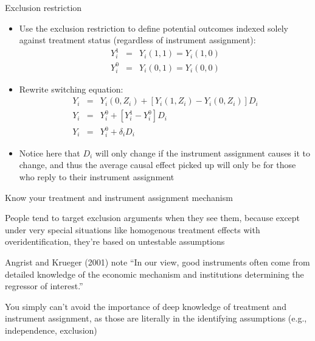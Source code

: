 \documentclass{beamer}
\begin{document}
\begin{frame}{Exclusion restriction}

  \begin{itemize}
    \item Use the exclusion restriction to define potential outcomes indexed solely against treatment status (regardless of instrument assignment):
          \begin{eqnarray*}
            Y^1_{i} &=& Y_i(1,1) = Y_i(1,0) \\
            Y^0_{i} &=& Y_i(0,1) = Y_i(0,0)
          \end{eqnarray*}
    \item Rewrite switching equation:
          \begin{eqnarray*}
            Y_i &=& Y_i(0,Z_i) + [Y_i(1,Z_i) - Y_i(0,Z_i)]D_i \\
            Y_i &=& Y^0_{i} + [Y^1_{i} - Y^0_{i}]D_i \\
            Y_i &=& Y^0_i + \delta_iD_i
          \end{eqnarray*}
    \item Notice here that $D_i$ will only change if the instrument assignment causes it to change, and thus the average causal effect picked up will only be for those who reply to their instrument assignment
  \end{itemize}

\end{frame}

\begin{frame}{Know your treatment and instrument assignment mechanism}

  People tend to target exclusion arguments when they see them, because except under very special situations like homogenous treatment effects with overidentification, they're based on untestable assumptions

  \bigskip

  Angrist and Krueger (2001) note ``In our view, good instruments often come from detailed knowledge of the economic mechanism and institutions determining the regressor of interest.''

  \bigskip

  You simply can't avoid the importance of deep knowledge of treatment and instrument assignment, as those are literally in the identifying assumptions (e.g., independence, exclusion)

\end{frame}
\end{document}
